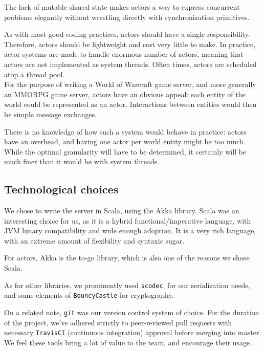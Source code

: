 \documentclass[paper=a4, fontsize=11pt]{scrartcl}
\begin{document}
The lack of mutable shared state makes actors a way to express concurrent
problems elegantly without wrestling directly with synchronization primitives.

As with most good coding practices, actors should have a single responsibility.
Therefore, actors should be lightweight and cost very little to make.
In practice, actor systems are made to handle enormous number of actors, meaning
that actors are not implemented as system threads. Often times, actors are
scheduled atop a thread pool.\\

For the purpose of writing a World of Warcraft game server, and more generally
an MMORPG game server, actors have an obvious appeal: each entity of the world
could be represented as an actor.
Interactions between entities would then be simple message exchanges.

There is no knowledge of how such a system would behave in practice: actors
have an overhead, and having one actor per world entity might be too much.
While the optimal granularity will have to be determined, it certainly will be
much finer than it would be with system threads.


\subsection{Technological choices}

We chose to write the server in Scala, using the Akka library.
Scala was an interesting choice for us, as it is a hybrid functional/imperative
language, with JVM binary compatibility and wide enough adoption.
It is a very rich language, with an extreme amount of flexibility and syntaxic
sugar.

For actors, Akka is the to-go library, which is also one of the reasons we chose
Scala.

As for other libraries, we prominently used \texttt{scodec}, for our
serialization needs, and some elements of \texttt{BouncyCastle} for
cryptography.

On a related note, \texttt{git} was our version control system of choice.
For the duration of the project, we've adhered strictly to peer-reviewed pull
requests with necessary \texttt{TravisCI} (continuous integration) approval
before merging into master.
We feel these tools bring a lot of value to the team, and encourage their usage.
\end{document}
